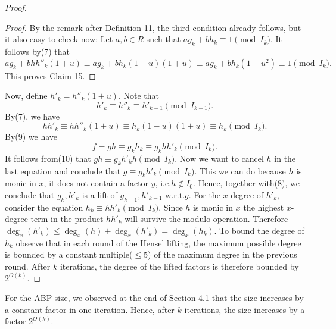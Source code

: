 \documentclass[10pt,a4paper]{article}
\begin{document}
\begin{proof}
\begin{proof}
By the remark after Definition 11, the third condition already follows, but it also easy to check now:
Let $a,b\in R$ such that $ag_k+bh_k\equiv1\pmod{I_k}$. It follows by(7) that
\[ag_k+bhh''_k(1+u)\equiv ag_k+bh_k(1-u)(1+u)\equiv ag_k+bh_k(1-u^2)\equiv1\pmod{I_k}.\]
This proves Claim 15.
\end{proof}
Now, define $h'_k=h''_k(1+u)$. Note that
\begin{equation}h'_k\equiv h''_k\equiv h'_{k-1}\pmod{I_{k-1}}.\tag{8}\end{equation}
By(7), we have
\begin{equation}hh'_k\equiv hh''_k(1+u)\equiv h_k(1-u)(1+u)\equiv h_k\pmod{I_k}.\tag{9}\end{equation}
By(9) we have
\begin{equation}f=gh\equiv g_kh_k\equiv g_khh'_k\pmod{I_k}.\tag{10}\end{equation}
It follows from(10) that $gh\equiv g_kh'_kh\pmod{I_k}$. Now we want to cancel $h$ in the last equation and conclude that $g\equiv g_kh'_k\pmod{I_k}$. This we can do because $h$ is monic in $x$, it does not contain a factor $y$, i.e.$h\notin I_0$. Hence, together with(8), we conclude that $g_k,h'_k$ is a lift of $g_{k-1},h'_{k-1}$ w.r.t.$g$.
For the $x$-degree of $h'_k$, consider the equation $h_k\equiv hh'_k\pmod{I_k}$. Since $h$ is monic in $x$ the highest $x$-degree term in the product $hh'_k$ will survive the modulo operation. Therefore $\deg_x(h'_k)\leq\deg_x(h)+\deg_x(h'_k)=\deg_x(h_k)$.
To bound the degree of $h_k$ observe that in each round of the Hensel lifting, the maximum possible degree is bounded by a constant multiple($\leq5$) of the maximum degree in the previous round. After $k$ iterations, the degree of the lifted factors is therefore bounded by $2^{O(k)}$.
\end{proof}
For the ABP-size, we observed at the end of Section 4.1 that the size increases by a constant factor in one iteration. Hence, after $k$ iterations, the size increases by a factor $2^{O(k)}$.
\end{document}
